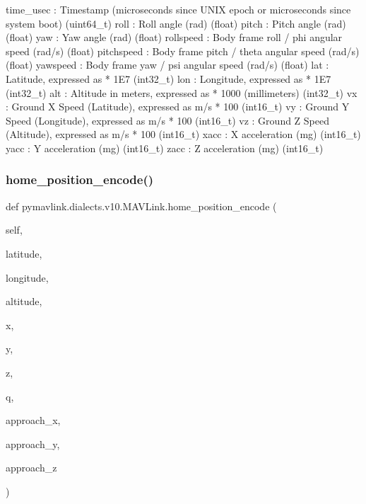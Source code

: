 \begin{DoxyVerb}
\begin{DoxyVerb}
\begin{DoxyVerb}
\begin{DoxyVerb}
\begin{DoxyVerb}
time_usec                 : Timestamp (microseconds since UNIX epoch or microseconds since system boot) (uint64_t)
roll                      : Roll angle (rad) (float)
pitch                     : Pitch angle (rad) (float)
yaw                       : Yaw angle (rad) (float)
rollspeed                 : Body frame roll / phi angular speed (rad/s) (float)
pitchspeed                : Body frame pitch / theta angular speed (rad/s) (float)
yawspeed                  : Body frame yaw / psi angular speed (rad/s) (float)
lat                       : Latitude, expressed as * 1E7 (int32_t)
lon                       : Longitude, expressed as * 1E7 (int32_t)
alt                       : Altitude in meters, expressed as * 1000 (millimeters) (int32_t)
vx                        : Ground X Speed (Latitude), expressed as m/s * 100 (int16_t)
vy                        : Ground Y Speed (Longitude), expressed as m/s * 100 (int16_t)
vz                        : Ground Z Speed (Altitude), expressed as m/s * 100 (int16_t)
xacc                      : X acceleration (mg) (int16_t)
yacc                      : Y acceleration (mg) (int16_t)
zacc                      : Z acceleration (mg) (int16_t)\end{DoxyVerb}
 \mbox{\label{classpymavlink_1_1dialects_1_1v10_1_1MAVLink_abe5d8c80bd6a304864a774081225b960}} 
\subsubsection{\texorpdfstring{home\+\_\+position\+\_\+encode()}{home\_position\_encode()}}
{\footnotesize\ttfamily def pymavlink.\+dialects.\+v10.\+M\+A\+V\+Link.\+home\+\_\+position\+\_\+encode (\begin{DoxyParamCaption}\item[{}]{self,  }\item[{}]{latitude,  }\item[{}]{longitude,  }\item[{}]{altitude,  }\item[{}]{x,  }\item[{}]{y,  }\item[{}]{z,  }\item[{}]{q,  }\item[{}]{approach\+\_\+x,  }\item[{}]{approach\+\_\+y,  }\item[{}]{approach\+\_\+z }\end{DoxyParamCaption})}


\end{DoxyVerb}
\end{DoxyVerb}
\end{DoxyVerb}
\end{DoxyVerb}
